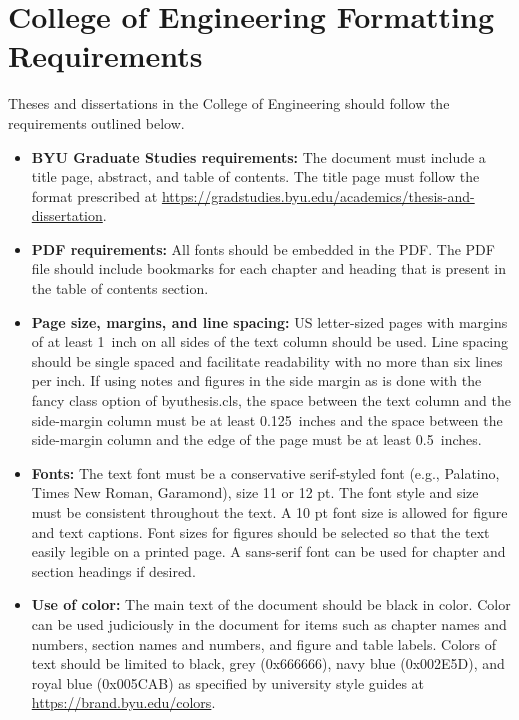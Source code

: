 \chapter{College of Engineering Formatting Requirements}
\label{ap:format}

Theses and dissertations in the College of Engineering should follow the requirements outlined below.

\begin{itemize}
 \item {\bfseries BYU Graduate Studies requirements:}  The document must include a title page, abstract, and table of contents. The title page must follow the format prescribed at \url{https://gradstudies.byu.edu/academics/thesis-and-dissertation}.  

\item {\bfseries PDF requirements:} All fonts should be embedded in the PDF. The PDF file should include bookmarks for each chapter and heading that is present in the table of contents section.

\item {\bfseries Page size, margins, and line spacing:} US letter-sized pages with margins of at least 1~inch on all sides of the text column should be used. Line spacing should be single spaced and facilitate readability with no more than six lines per inch. If using notes and figures in the side margin as is done with the {\ttfamily fancy} class option of {\ttfamily byuthesis.cls}, the space between the text column and the side-margin column must be at least 0.125~inches and the space between the side-margin column and the edge of the page must be at least 0.5~inches. 

\item {\bfseries Fonts:} The text font must be a conservative serif-styled font (e.g., Palatino, Times New Roman, Garamond), size 11 or 12 pt. The font style and size must be consistent throughout the text. A 10 pt font size is allowed for figure and text captions. Font sizes for figures should be selected so that the text easily legible on a printed page. A sans-serif font can be used for chapter and section headings if desired.

\item {\bfseries Use of color:} The main text of the document should be black in color. Color can be used judiciously in the document for items such as chapter names and numbers, section names and numbers, and figure and table labels. Colors of text should be limited to black, grey ({\ttfamily 0x666666}), navy blue ({\ttfamily 0x002E5D}), and royal blue ({\ttfamily 0x005CAB}) as specified by university style guides at \url{https://brand.byu.edu/colors}.


\end{itemize}
